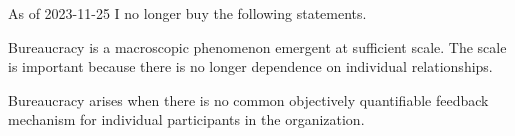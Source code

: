As of 2023-11-25 I no longer buy the following statements.

Bureaucracy is a macroscopic phenomenon emergent at sufficient scale. The scale is important because there is no longer dependence on individual relationships. 


Bureaucracy arises when there is no common objectively quantifiable feedback mechanism for individual participants in the organization.